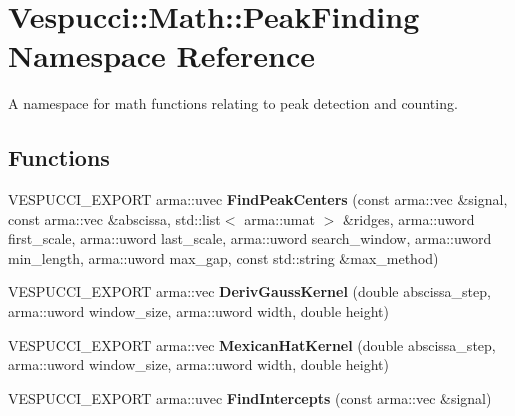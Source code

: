 \hypertarget{namespace_vespucci_1_1_math_1_1_peak_finding}{}\section{Vespucci\+:\+:Math\+:\+:Peak\+Finding Namespace Reference}
\label{namespace_vespucci_1_1_math_1_1_peak_finding}


A namespace for math functions relating to peak detection and counting.  


\subsection*{Functions}
\begin{DoxyCompactItemize}
\item 
V\+E\+S\+P\+U\+C\+C\+I\+\_\+\+E\+X\+P\+O\+RT arma\+::uvec {\bfseries Find\+Peak\+Centers} (const arma\+::vec \&signal, const arma\+::vec \&abscissa, std\+::list$<$ arma\+::umat $>$ \&ridges, arma\+::uword first\+\_\+scale, arma\+::uword last\+\_\+scale, arma\+::uword search\+\_\+window, arma\+::uword min\+\_\+length, arma\+::uword max\+\_\+gap, const std\+::string \&max\+\_\+method)\hypertarget{namespace_vespucci_1_1_math_1_1_peak_finding_a4db4c2f1e08f6326157be8a7f90ec42b}{}\label{namespace_vespucci_1_1_math_1_1_peak_finding_a4db4c2f1e08f6326157be8a7f90ec42b}

\item 
V\+E\+S\+P\+U\+C\+C\+I\+\_\+\+E\+X\+P\+O\+RT arma\+::vec {\bfseries Deriv\+Gauss\+Kernel} (double abscissa\+\_\+step, arma\+::uword window\+\_\+size, arma\+::uword width, double height)\hypertarget{namespace_vespucci_1_1_math_1_1_peak_finding_a0226402354861e6de00beedcd2c5786e}{}\label{namespace_vespucci_1_1_math_1_1_peak_finding_a0226402354861e6de00beedcd2c5786e}

\item 
V\+E\+S\+P\+U\+C\+C\+I\+\_\+\+E\+X\+P\+O\+RT arma\+::vec {\bfseries Mexican\+Hat\+Kernel} (double abscissa\+\_\+step, arma\+::uword window\+\_\+size, arma\+::uword width, double height)\hypertarget{namespace_vespucci_1_1_math_1_1_peak_finding_a6c94bf49cd2c7b4de7ee3171a06fc2ea}{}\label{namespace_vespucci_1_1_math_1_1_peak_finding_a6c94bf49cd2c7b4de7ee3171a06fc2ea}

\item 
V\+E\+S\+P\+U\+C\+C\+I\+\_\+\+E\+X\+P\+O\+RT arma\+::uvec {\bfseries Find\+Intercepts} (const arma\+::vec \&signal)\hypertarget{namespace_vespucci_1_1_math_1_1_peak_finding_ab4a5eddad57d84fb16e79914df07785b}{}\label{namespace_vespucci_1_1_math_1_1_peak_finding_ab4a5eddad57d84fb16e79914df07785b}


\end{DoxyCompactItemize}
